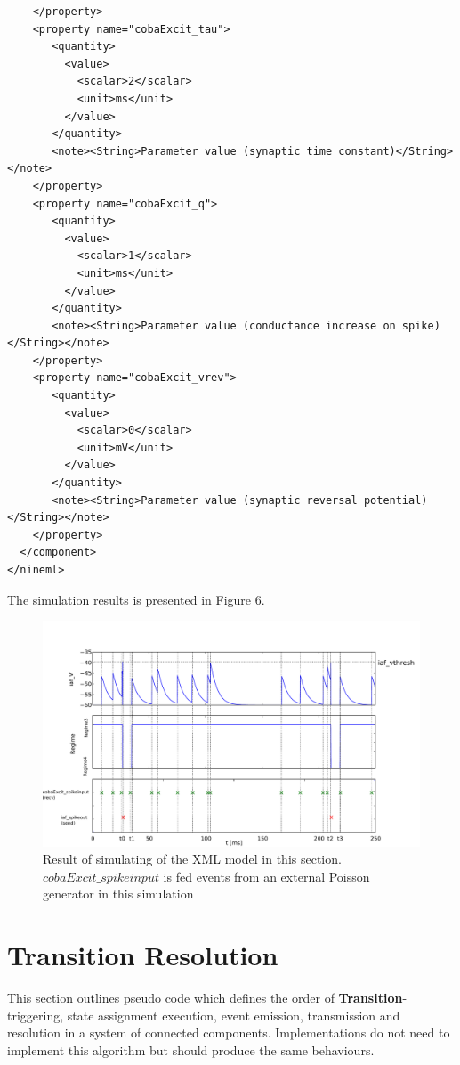 \documentclass{article}
\newcommand{\Transition}{{\bf{Transition}}\xspace}
\begin{document}
\begin{lstlisting}
    </property>
    <property name="cobaExcit_tau">
       <quantity>
         <value>
           <scalar>2</scalar>
           <unit>ms</unit>
         </value>
       </quantity>
       <note><String>Parameter value (synaptic time constant)</String></note>
    </property>
    <property name="cobaExcit_q">
       <quantity>
         <value>
           <scalar>1</scalar>
           <unit>ms</unit>
         </value>
       </quantity>
       <note><String>Parameter value (conductance increase on spike)</String></note>
    </property>
    <property name="cobaExcit_vrev">
       <quantity>
         <value>
           <scalar>0</scalar>
           <unit>mV</unit>
         </value>
       </quantity>
       <note><String>Parameter value (synaptic reversal potential)</String></note>
    </property>
  </component>
</nineml>
\end{lstlisting}

The simulation results is presented in Figure 6.
\begin{figure}[htb!]
\center
\includegraphics[width=14cm]{figures/demo2_Coba1_out.pdf}
\protect\caption{Result of simulating of the XML model in this section.
$cobaExcit\_spikeinput$ is fed events from an external Poisson generator
in this simulation}
\label{fig:EX2_Output}
\end{figure}

\pagebreak

\newpage

\section{Transition Resolution}
\label{resolution}

This section outlines pseudo code which defines the order of
\Transition-triggering, state assignment execution, event emission,
transmission and resolution in a system of connected components.
Implementations do not need to implement this algorithm but should produce
the same behaviours.
\end{document}

